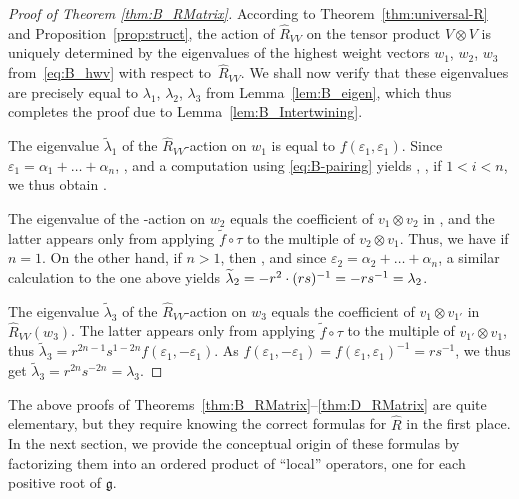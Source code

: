 \documentclass[10pt,a4paper]{amsart}
\numberwithin{equation}{section}
\newcommand{\fg}{\mathfrak{g}}
\begin{document}
\begin{proof}[Proof of Theorem \ref{thm:B_RMatrix}]
According to Theorem~\ref{thm:universal-R} and Proposition~\ref{prop:struct}, the action of $\hat{R}_{VV}$ on the tensor product $V\otimes V$ is uniquely determined by the eigenvalues of the highest weight vectors $w_1$, $w_2$, $w_3$ from~\eqref{eq:B_hwv} with respect to~$\hat{R}_{VV}$. We shall now verify that these eigenvalues are precisely equal to $\lambda_1$, $\lambda_2$, $\lambda_3$ from Lemma~\ref{lem:B_eigen}, which thus completes the proof due to Lemma~\ref{lem:B_Intertwining}.

The eigenvalue $\widetilde{\lambda}_1$ of the $\hat{R}_{VV}$-action on $w_1$ is equal to $f(\varepsilon_{1},\varepsilon_{1})$. Since $\varepsilon_1=\alpha_1+\dots+\alpha_n$, , and a computation using \eqref{eq:B-pairing} yields , ,  if $1<i<n$, we thus obtain .


The eigenvalue  of the -action on $w_2$ equals the coefficient of $v_1\otimes v_2$ in , and the latter appears only from applying $\widetilde{f}\circ \tau$ to the multiple of $v_2\otimes v_1$. Thus, we have  if $n = 1$. On the other hand, if $n > 1$, then , and since $\varepsilon_2=\alpha_2+\dots+\alpha_n$, a similar calculation to the one above yields $\smash{\widetilde{\lambda}_2}=-r^2\cdot (rs)^{-1}=-rs^{-1}=\lambda_2$.


The eigenvalue $\widetilde{\lambda}_3$ of the $\hat{R}_{VV}$-action on $w_3$ equals the coefficient of $v_1\otimes v_{1'}$ in $\hat{R}_{VV}(w_3)$. The latter appears only from applying $\widetilde{f}\circ \tau$ to the multiple of $v_{1'}\otimes v_1$, thus $\widetilde{\lambda}_3=r^{2n-1}s^{1-2n} f(\varepsilon_1,-\varepsilon_1)$. As $f(\varepsilon_1,-\varepsilon_1)=f(\varepsilon_1,\varepsilon_1)^{-1}=rs^{-1}$, we thus get $\widetilde{\lambda}_3=r^{2n}s^{-2n}=\lambda_3$.
\end{proof}


\begin{Remark}\label{rem:easy-finite}
The above proofs of Theorems~\ref{thm:B_RMatrix}--\ref{thm:D_RMatrix} are quite elementary, but they require knowing the correct formulas for $\hat{R}$ in the first place. In the next section, we provide the conceptual origin of these formulas by factorizing them into an ordered product of ``local'' operators, one for each positive root of $\fg$.
\end{Remark}
\end{document}
